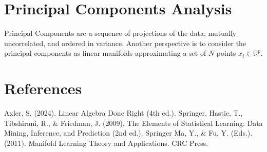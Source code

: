 \documentclass{article}
\begin{document}
\section{Principal Components Analysis}
Principal Components are a sequence of projections of the data, mutually uncorrelated, and ordered in variance. Another perspective is to consider the principal components as linear manifolds 
approximating a set of $N$ points $x_i \in \mathbb{R}^p$. \newline \newline
\section{References}
Axler, S. (2024). Linear Algebra Done Right (4th ed.). Springer. \newline \newline
Hastie, T., Tibshirani, R., \& Friedman, J. (2009). The Elements of Statistical Learning: Data Mining, Inference, and Prediction (2nd ed.). Springer \newline \newline 
Ma, Y., \& Fu, Y. (Eds.). (2011). Manifold Learning Theory and Applications. CRC Press.
\end{document}
